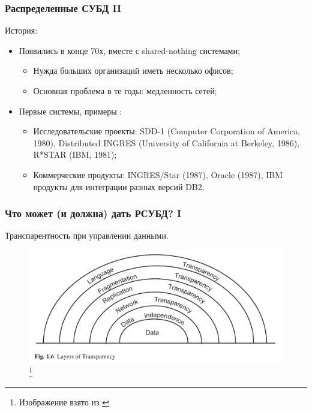 \documentclass{beamer}
\begin{document}
\begin{frame}
\frametitle{Распределенные СУБД II}

История:

\begin{itemize}
  \setlength\itemsep{1em}
  \item Появились в конце 70х, вместе с shared-nothing системами;
  \begin{itemize}
    \setlength\itemsep{1em}
    \item Нужда больших организаций иметь несколько офисов;
    \item Основная проблема в те годы: медленность сетей;
  \end{itemize}
  \item Первые системы, примеры \cite{Kian-Lee2009}:
\begin{itemize}
  \setlength\itemsep{1em}
  \item Исследовательские проекты: SDD-1 (Computer Corporation of America, 1980), Distributed INGRES (University of California at Berkeley, 1986), R*STAR (IBM, 1981); 
  \item Коммерческие продукты: INGRES/Star (1987), Oracle (1987), IBM продукты для интеграции разных версий DB2.
\end{itemize}


\end{itemize}

\end{frame}


\begin{frame}
\frametitle{Что может (и должна) дать РСУБД? I}

\alert{Транспарентность при управлении данными.}

\begin{figure}[htb]
\includegraphics[width=\textwidth,height=0.80\textheight,keepaspectratio]{ozsu-2.png} 
\footnote{\tiny{Изображение взято из \cite{Ozsu2011}}}
\end{figure}

\end{frame}
\end{document}
